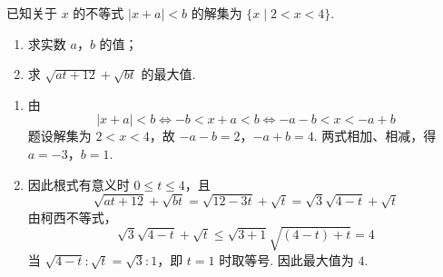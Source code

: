  \begin{problem}
 已知关于 \(x\) 的不等式 \(|x + a| < b\) 的解集为 \(\{x \mid 2 < x < 4\}\).

\begin{enumerate}
\item 求实数 \(a\)，\(b\) 的值；
\item 求 \(\sqrt{at+12}+\sqrt{bt}\) 的最大值.
 \end{enumerate}
 \end{problem}

\begin{solution}
\begin{enumerate}
\item
由
\[
|x+a|<b\Longleftrightarrow -b<x+a<b\Longleftrightarrow -a-b<x<-a+b
\]
题设解集为 \(2<x<4\)，故
\(-a-b=2\)，\(-a+b=4\).
两式相加、相减，得 \(a=-3\)，\(b=1\).

\item
因此根式有意义时 \(0\leqslant t\leqslant4\)，且
\[
\sqrt{at+12}+\sqrt{bt}=\sqrt{12-3t}+\sqrt{t}=\sqrt{3}\sqrt{4-t}+\sqrt{t}
\]
由柯西不等式，
\[
\sqrt{3}\sqrt{4-t}+\sqrt{t}\leqslant\sqrt{3+1}\sqrt{(4-t)+t}=4
\]
当 \(\sqrt{4-t}:\sqrt{t}=\sqrt{3}:1\)，即 \(t=1\) 时取等号. 因此最大值为 \(4\).
\end{enumerate}
\end{solution}
